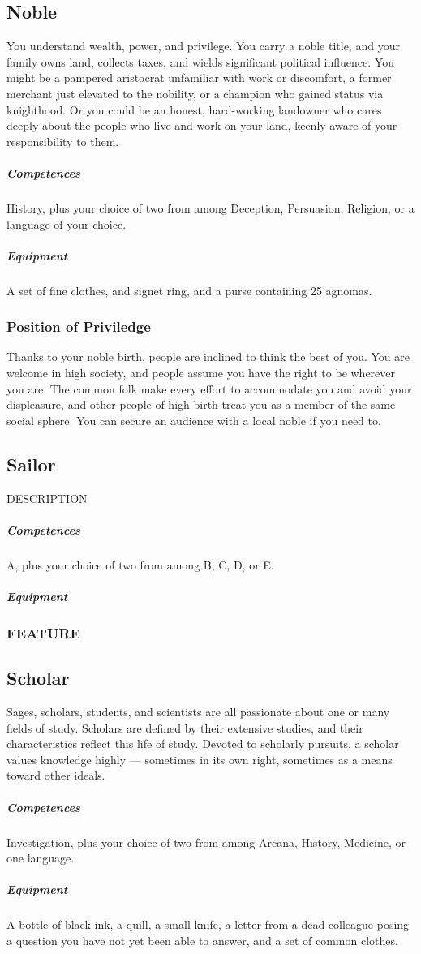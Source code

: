 \subsection*{Noble} \label{ssec::noble}
    You understand wealth, power, and privilege.
    You carry a noble title, and your family owns land, collects taxes, and wields significant political influence.
    You might be a pampered aristocrat unfamiliar with work or discomfort, a former merchant just elevated to the nobility, or a champion who gained status via knighthood.
    Or you could be an honest, hard-working landowner who cares deeply about the people who live and work on your land, keenly aware of your responsibility to them.
    \subparagraph{Competences} History, plus your choice of two from among Deception, Persuasion, Religion, or a language of your choice.
    \subparagraph{Equipment} A set of fine clothes, and signet ring, and a purse containing 25 agnomas.
    \subsubsection{Position of Priviledge}
        Thanks to your noble birth, people are inclined to think the best of you.
        You are welcome in high society, and people assume you have the right to be wherever you are.
        The common folk make every effort to accommodate you and avoid your displeasure, and other people of high birth treat you as a member of the same social sphere.
        You can secure an audience with a local noble if you need to.

\subsection*{Sailor} \label{ssec::sailor}
    DESCRIPTION
    \subparagraph{Competences} A, plus your choice of two from among B, C, D, or E.
    \subparagraph{Equipment}
    \subsubsection{FEATURE}

\subsection*{Scholar} \label{ssec::scholar}
    Sages, scholars, students, and scientists are all passionate about one or many fields of study.
    Scholars are defined by their extensive studies, and their characteristics reflect this life of study.
    Devoted to scholarly pursuits, a scholar values knowledge highly --- sometimes in its own right, sometimes as a means toward other ideals.
    \subparagraph{Competences} Investigation, plus your choice of two from among Arcana, History, Medicine, or one language.
    \subparagraph{Equipment} A bottle of black ink, a quill, a small knife, a letter from a dead colleague posing a question you have not yet been able to answer, and a set of common clothes.
